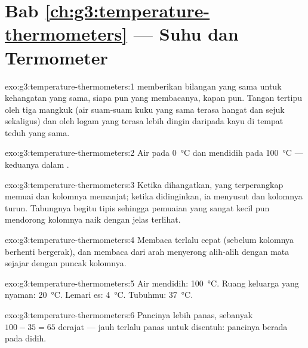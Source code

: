 \section*{Bab \ref{ch:g3:temperature-thermometers} --- Suhu dan Termometer}

\begin{solution}{exo:g3:temperature-thermometers:1}
 memberikan bilangan yang sama untuk kehangatan yang sama,
siapa pun yang membacanya, kapan pun. Tangan tertipu oleh tiga mangkuk
(air suam-suam kuku yang sama terasa hangat dan sejuk sekaligus) dan
oleh logam yang terasa lebih dingin daripada kayu di tempat teduh yang
sama.
\end{solution}

\begin{solution}{exo:g3:temperature-thermometers:2}
Air  pada \qty{0}{\celsius} dan mendidih pada
\qty{100}{\celsius} --- keduanya dalam .
\end{solution}

\begin{solution}{exo:g3:temperature-thermometers:3}
Ketika dihangatkan,  yang terperangkap memuai dan kolomnya
memanjat; ketika didinginkan, ia menyusut dan kolomnya turun.
Tabungnya begitu tipis sehingga pemuaian yang sangat kecil pun
mendorong kolomnya naik dengan jelas terlihat.
\end{solution}

\begin{solution}{exo:g3:temperature-thermometers:4}
Membaca terlalu cepat (sebelum kolomnya berhenti bergerak), dan
membaca dari arah menyerong alih-alih dengan mata sejajar dengan
puncak kolomnya.
\end{solution}

\begin{solution}{exo:g3:temperature-thermometers:5}
Air mendidih: \qty{100}{\celsius}. Ruang keluarga yang nyaman:
\qty{20}{\celsius}. Lemari es: \qty{4}{\celsius}. Tubuhmu:
\qty{37}{\celsius}.
\end{solution}

\begin{solution}{exo:g3:temperature-thermometers:6}
Pancinya lebih panas, sebanyak $100 - 35 = 65$ derajat --- jauh
terlalu panas untuk disentuh: pancinya berada pada  didih.
\end{solution}

